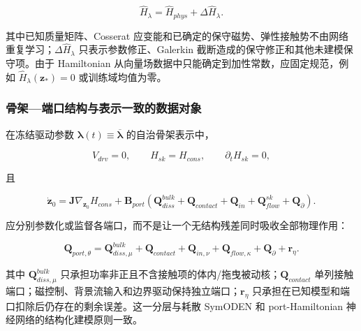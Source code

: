 \begin{equation}
\label{eq:hamiltonian-3-70}
\boxed{{\widehat{H}}_{\lambda} = {\widehat{H}}_{phys} + \Delta{\widehat{H}}_{\lambda}.}
\end{equation}

其中已知质量矩阵、Cosserat 应变能和已确定的保守磁势、弹性接触势不由网络重复学习；\(\Delta{\widehat{H}}_{\lambda}\) 只表示参数修正、Galerkin 截断造成的保守修正和其他未建模保守项。由于 Hamiltonian 从向量场数据中只能确定到加性常数，应固定规范，例如 \({\widehat{H}}_{\lambda}\left( \mathbf{z}_{*} \right) = 0\) 或训练域均值为零\cite{Greydanus2019HNN,Desai2021PHNN}。

\subsubsection{骨架---端口结构与表示一致的数据对象}\label{sec:hamiltonian-3-7-2}

在冻结驱动参数 \(\bm{\lambda}(t) \equiv \overline{\bm{\lambda}}\) 的自治骨架表示中，

\begin{equation}
\label{eq:hamiltonian-3-71}
V_{drv} = 0,\quad\quad H_{sk} = H_{cons},\quad\quad\partial_{t}H_{sk} = 0,
\end{equation}

且

\begin{equation}
\label{eq:hamiltonian-3-72}
\boxed{{\dot{\mathbf{z}}}_{0} = \mathbf{J}\nabla_{\mathbf{z}_{0}}H_{cons} + \mathbf{B}_{port}\left( \mathbf{Q}_{diss}^{bulk} + \mathbf{Q}_{contact} + \mathbf{Q}_{in} + \mathbf{Q}_{flow}^{sk} + \mathbf{Q}_{\partial} \right).}
\end{equation}

应分别参数化或监督各端口，而不是让一个无结构残差同时吸收全部物理作用：

\begin{equation}
\label{eq:hamiltonian-3-73}
\mathbf{Q}_{port,\theta} = \mathbf{Q}_{diss,\mu}^{bulk} + \mathbf{Q}_{contact} + \mathbf{Q}_{in,\nu} + \mathbf{Q}_{flow,\kappa} + \mathbf{Q}_{\partial} + \mathbf{r}_{\eta}.
\end{equation}

其中 \(\mathbf{Q}_{diss,\mu}^{bulk}\) 只承担功率非正且不含接触项的体内/拖曳被动核；\(\mathbf{Q}_{contact}\) 单列接触端口；磁控制、背景流输入和边界驱动保持独立端口；\(\mathbf{r}_{\eta}\) 只承担在已知模型和端口扣除后仍存在的剩余误差。这一分层与耗散 SymODEN 和 port-Hamiltonian 神经网络的结构化建模原则一致\cite{Zhong2020Dissipative,Desai2021PHNN}。

